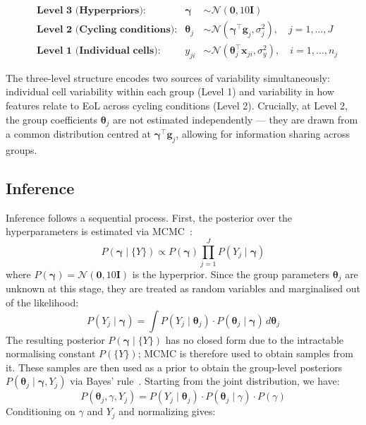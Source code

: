 \begin{align*}
&\textbf{Level 3 (Hyperpriors):} & \boldsymbol{\gamma} &\sim \mathcal{N}(\mathbf{0}, 10\mathbf{I}) \\[6pt]
&\textbf{Level 2 (Cycling conditions):} & \boldsymbol{\theta}_j &\sim \mathcal{N}(\boldsymbol{\gamma}^\top \mathbf{g}_j, \sigma^2_j), \quad j = 1, \dots, J \\[6pt]
&\textbf{Level 1 (Individual cells):} & y_{ji} &\sim \mathcal{N}(\boldsymbol{\theta}_j^\top \mathbf{x}_{ji}, \sigma^2_y), \quad i = 1, \dots, n_j
\end{align*}

The three-level structure encodes two sources of variability simultaneously: individual cell variability within each group (Level 1) and variability in 
how features relate to EoL across cycling conditions (Level 2). Crucially, at Level 2, the group coefficients $\boldsymbol{\theta}_j$ are not estimated 
independently — they are drawn from a common distribution centred at $\boldsymbol{\gamma}^\top \mathbf{g}_j$, allowing for information sharing across groups.

\subsection{Inference}
Inference follows a sequential process. First, the posterior over the hyperparameters is estimated via MCMC~\cite{ZHOU20236117}:
\[
P(\boldsymbol{\gamma} \mid \{Y\}) \propto P(\boldsymbol{\gamma}) \prod_{j=1}^{J} P(Y_j \mid \boldsymbol{\gamma})
\]
where $P(\boldsymbol{\gamma}) = \mathcal{N}(\mathbf{0}, 10\mathbf{I})$ is the hyperprior. Since the group parameters $\boldsymbol{\theta}_j$ are unknown at this stage, they are treated as random variables and marginalised out of the likelihood:
\[
P(Y_j \mid \boldsymbol{\gamma}) = \int P(Y_j \mid \boldsymbol{\theta}_j) \cdot P(\boldsymbol{\theta}_j \mid \boldsymbol{\gamma}) \, d\boldsymbol{\theta}_j
\]
The resulting posterior $P(\boldsymbol{\gamma} \mid \{Y\})$ has no closed form due to the intractable normalising constant $P(\{Y\})$; MCMC is therefore used to obtain samples from it. 
These samples are then used as a prior to obtain the group-level posteriors $P(\boldsymbol{\theta}_j \mid \boldsymbol{\gamma}, Y_j)$ via Bayes' rule~\cite{ZHOU20236117}. Starting from the joint distribution, we have:
$$P(\boldsymbol{\theta}_j, \gamma, Y_j) = P(Y_j \mid \boldsymbol{\theta}_j) \cdot P(\boldsymbol{\theta}_j \mid \gamma) \cdot P(\gamma)$$
Conditioning on $\gamma$ and $Y_j$ and normalizing gives:

